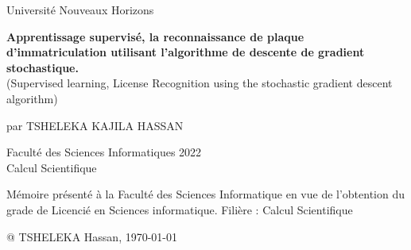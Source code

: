\sloppy
\begin{titlepage}
  \begin{singlespace}
\begin{center}
{Université Nouveaux Horizons} \vspace{1.5 cm}\\
\end{center}

\begin{center}

\Large{{\bf{Apprentissage supervisé, la reconnaissance de plaque d'immatriculation utilisant l'algorithme de descente de gradient stochastique.}}
	\\ (Supervised learning, License Recognition using the stochastic gradient descent algorithm)}


\end{center}
\vspace{1.5 cm}
\begin{center}
	\normalsize{par TSHELEKA KAJILA HASSAN}
	\vspace{1.5 cm}
\end{center}

\begin{center}
Faculté des Sciences Informatiques 2022\\
Calcul Scientifique
\end{center}
\vspace{1.5 cm}

\begin{center}
Mémoire présenté à la Faculté des Sciences Informatique en vue de l'obtention du grade de Licencié en 
Sciences informatique. Filière : Calcul Scientifique
\end{center}
\vspace{1.5 cm} 






\begin{center}
\vspace{3 cm}
@ TSHELEKA Hassan, \today
\end{center}
  \end{singlespace}

  \newpage
\end{titlepage} 